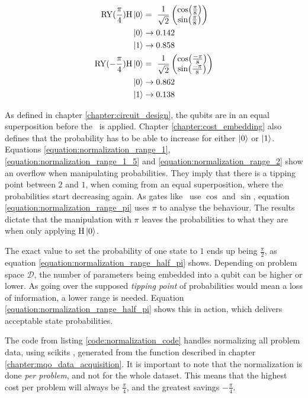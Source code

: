 \begin{equation}
    \centering
    \begin{split}
        \mathrm{RY}(\frac{\pi}{4})\mathrm{H}\ket{0} &=\ \frac{1}{\sqrt{2}}\begin{pmatrix}\cos(\frac{\pi}{8}) \\ \sin(\frac{\pi}{8})\end{pmatrix}\\
        \ket{0} &\to 0.142 \\
        \ket{1} &\to 0.858 \\
        \mathrm{RY}(-\frac{\pi}{4})\mathrm{H}\ket{0} &=\ \frac{1}{\sqrt{2}}\begin{pmatrix}\cos(\frac{-\pi}{8}) \\ \sin(\frac{-\pi}{8})\end{pmatrix}\\
        \ket{0} &\to 0.862 \\
        \ket{1} &\to 0.138 \\
    \end{split}
    \label{equation:normalization_range_forth_pi}
\end{equation}

As defined in chapter \ref{chapter:circuit_design}, the qubits are in an equal superposition before the \rygate\ is applied. Chapter \ref{chapter:cost_embedding} also defines that the probability has to be able to increase for either $\ket{0}$ or $\ket{1}$. Equations \ref{equation:normalization_range_1}, \ref{equation:normalization_range_1_5} and \ref{equation:normalization_range_2} show an overflow when manipulating probabilities. They imply that there is a tipping point between $2$ and $1$, when coming from an equal superposition, where the probabilities start decreasing again. As gates like \rygate\ use $\cos$ and $\sin$, equation \ref{equation:normalization_range_pi} uses $\pi$ to analyse the behaviour. The results dictate that the manipulation with $\pi$ leaves the probabilities to what they are when only applying $\mathrm{H}\ket{0}$. \par
The exact value to set the probability of one state to $1$ ends up being $\frac{\pi}{2}$, as equation \ref{equation:normalization_range_half_pi} shows. Depending on problem space $\mathcal{D}$, the number of parameters being embedded into a qubit can be higher or lower. As going over the supposed \emph{tipping point} of probabilities would mean a loss of information, a lower range is needed. Equation \ref{equation:normalization_range_half_pi} shows this in action, which delivers acceptable state probabilities.\par
The code from listing \ref{code:normalization_code} handles normalizing all problem data, using scikits\cite{scikit-learn} , generated from the function described in chapter \ref{chapter:mqo_data_acquisition}. It is important to note that the normalization is done \emph{per problem}, and not for the whole dataset. This means that the highest cost per problem will always be $\frac{\pi}{4}$, and the greatest savings $-\frac{\pi}{4}$.

